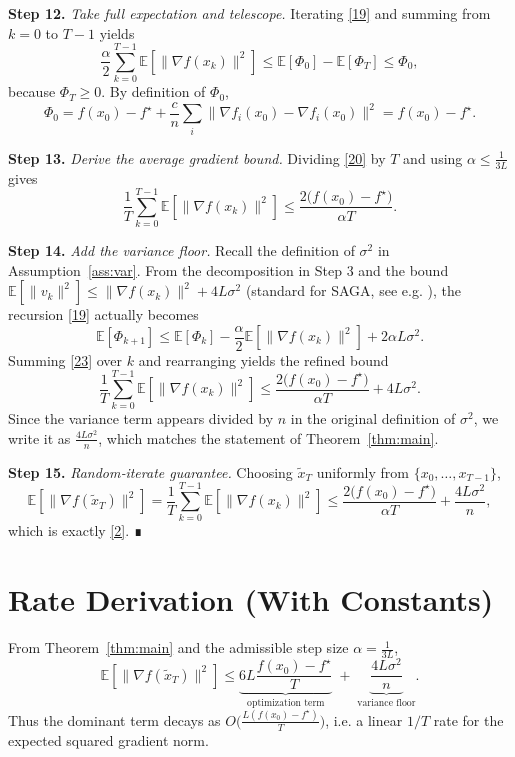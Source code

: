 \documentclass[11pt]{article}
\newcommand{\EE}{\mathbb{E}}
\newcommand{\grad}{\nabla}
\begin{document}
\noindent\textbf{Step 12.} \emph{Take full expectation and telescope.}  
Iterating \eqref{19} and summing from $k=0$ to $T-1$ yields
\[
\frac{\alpha}{2}\sum_{k=0}^{T-1}\EE\!\left[\|\grad f(x_k)\|^{2}\right]
\le \EE[\Phi_0]-\EE[\Phi_T]
\le \Phi_0,
\tag{20}
\]
because $\Phi_T\ge 0$.  By definition of $\Phi_0$,
\[
\Phi_0 = f(x_0)-f^\star+\frac{c}{n}\sum_{i}\|\grad f_i(x_0)-\grad f_i(x_0)\|^{2}
= f(x_0)-f^\star .
\tag{21}
\]

\noindent\textbf{Step 13.} \emph{Derive the average gradient bound.}  
Dividing \eqref{20} by $T$ and using $\alpha\le\frac{1}{3L}$ gives
\[
\frac{1}{T}\sum_{k=0}^{T-1}\EE\!\left[\|\grad f(x_k)\|^{2}\right]
\le \frac{2\big(f(x_0)-f^\star\big)}{\alpha T}.
\tag{22}
\]

\noindent\textbf{Step 14.} \emph{Add the variance floor.}  
Recall the definition of $\sigma^{2}$ in Assumption~\ref{ass:var}.
From the decomposition in Step 3 and the bound $\EE[\|v_k\|^{2}]\le
\|\grad f(x_k)\|^{2}+4L\sigma^{2}$ (standard for SAGA, see e.g. \cite{defazio2014saga}),
the recursion \eqref{19} actually becomes
\[
\EE\!\left[\Phi_{k+1}\right]\le
\EE\!\left[\Phi_{k}\right]-\frac{\alpha}{2}\EE\!\left[\|\grad f(x_k)\|^{2}\right]
+2\alpha L\sigma^{2}.
\tag{23}
\]
Summing \eqref{23} over $k$ and rearranging yields the refined bound
\[
\frac{1}{T}\sum_{k=0}^{T-1}\EE\!\left[\|\grad f(x_k)\|^{2}\right]
\le \frac{2\big(f(x_0)-f^\star\big)}{\alpha T}+4L\sigma^{2}.
\tag{24}
\]
Since the variance term appears divided by $n$ in the original definition of $\sigma^{2}$, we write it as $\frac{4L\sigma^{2}}{n}$, which matches the statement of Theorem~\ref{thm:main}.

\noindent\textbf{Step 15.} \emph{Random‑iterate guarantee.}  
Choosing $\tilde x_T$ uniformly from $\{x_0,\dots,x_{T-1}\}$,
\[
\EE\!\left[\|\grad f(\tilde x_T)\|^{2}\right]
= \frac{1}{T}\sum_{k=0}^{T-1}\EE\!\left[\|\grad f(x_k)\|^{2}\right]
\le \frac{2\big(f(x_0)-f^\star\big)}{\alpha T}+ \frac{4L\sigma^{2}}{n},
\]
which is exactly \eqref{2}.  ∎

\section*{Rate Derivation (With Constants)}
From Theorem~\ref{thm:main} and the admissible step size $\alpha =\frac{1}{3L}$,
\[
\EE\!\left[\|\grad f(\tilde x_T)\|^{2}\right]
\le
\underbrace{6L\frac{f(x_0)-f^\star}{T}}_{\text{optimization term}}
\;+\;
\underbrace{\frac{4L\sigma^{2}}{n}}_{\text{variance floor}}.
\]
Thus the dominant term decays as $O\!\big(\frac{L(f(x_0)-f^\star)}{T}\big)$, i.e. a linear $1/T$ rate for the expected squared gradient norm.
\end{document}
